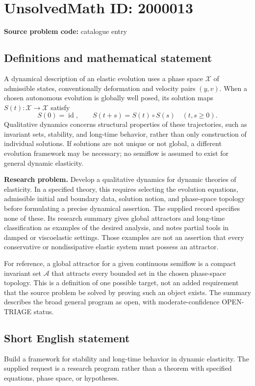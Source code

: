\documentclass[11pt]{article}
\begin{document}
\section*{UnsolvedMath ID: 2000013}
\textbf{Source problem code:} catalogue entry
\subsection{Definitions and mathematical statement}
A dynamical description of an elastic evolution uses a phase space $\mathcal X$ of admissible states, conventionally deformation and velocity pairs $(y,v)$. When a chosen autonomous evolution is globally well posed, its solution maps $S(t):\mathcal X\to\mathcal X$ satisfy
\[
S(0)=\operatorname{id},\qquad S(t+s)=S(t)\circ S(s)\quad(t,s\geq0).
\]
Qualitative dynamics concerns structural properties of these trajectories, such as invariant sets, stability, and long-time behavior, rather than only construction of individual solutions. If solutions are not unique or not global, a different evolution framework may be necessary; no semiflow is assumed to exist for general dynamic elasticity.

\textbf{Research problem.} Develop a qualitative dynamics for dynamic theories of elasticity. In a specified theory, this requires selecting the evolution equations, admissible initial and boundary data, solution notion, and phase-space topology before formulating a precise dynamical assertion. The supplied record specifies none of these. Its research summary gives global attractors and long-time classification as examples of the desired analysis, and notes partial tools in damped or viscoelastic settings. Those examples are not an assertion that every conservative or nondissipative elastic system must possess an attractor.

For reference, a global attractor for a given continuous semiflow is a compact invariant set $\mathcal A$ that attracts every bounded set in the chosen phase-space topology. This is a definition of one possible target, not an added requirement that the source problem be solved by proving such an object exists. The summary describes the broad general program as open, with moderate-confidence OPEN-TRIAGE status.
\subsection{Short English statement}
Build a framework for stability and long-time behavior in dynamic elasticity. The supplied request is a research program rather than a theorem with specified equations, phase space, or hypotheses.
\end{document}
